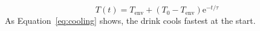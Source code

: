 \begin{equation}
    T(t) = T_\mathrm{env} + (T_0 - T_\mathrm{env}) \mathrm{e}^{-t/\tau}
    \label{eq:cooling}
\end{equation}
As Equation~\eqref{eq:cooling} shows, the drink cools fastest at the start.

